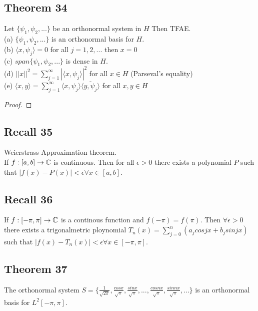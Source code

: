 \documentclass{article}
\begin{document}
\subsection * {Theorem 34}
Let $\{\psi_1, \psi_2,... \}$ be an orthonormal system in $H$ Then TFAE.\\
(a) $\{\psi_1, \psi_2,...\}$ is an orthonormal basis for $H$.\\
(b) $\langle x, \psi_j \rangle = 0 $ for all $j=1,2,...$ then $x=0$\\
(c) $span\{ \psi_1, \psi_2,...\} $ is dense in $H$.\\
(d) $||x||^2 = \sum_{j=1}^{\infty} |\langle x, \psi_j\rangle |^2 $ for all $x\in H$ (Parseval's equality)\\
(e) $\langle x,y \rangle = \sum_{j=1}^{\infty}\langle x, \psi_j \rangle \overline{\langle y, \psi_j \rangle}$ for all $ x,y \in H$\\

\begin{proof}
\end{proof}

\subsection*{Recall 35}
Weierstrass Approximation theorem.\\
If $f:[a,b]\rightarrow \Bbb{C}$ is continuous. Then for all $\epsilon >0$ there exists a polynomial $P$ such that $|f(x)-P(x)|<\epsilon \forall x\in [a,b]$.

\subsection*{Recall 36}
If $f:[-\pi, \pi ]\rightarrow \Bbb{C} $ is a continous function and $f(-\pi)=f(\pi)$. Then $\forall \epsilon >0$ there exists a trigonalmetric ploynomial $T_n(x)=\sum_{j=0}^{n}(a_j cos jx+b_jsin jx)$ such that $|f(x) -T_n(x)|<\epsilon \forall x\in [-\pi,\pi]$.

\subsection*{Theorem 37}
The orthonormal system $S=\{\frac{1}{\sqrt{2\pi}},\frac{cos x}{\sqrt{\pi}},\frac{sin x}{\sqrt{\pi}},...,\frac{cos nx}{\sqrt{\pi}},\frac{sin nx}{\sqrt{\pi}},...\}$ is an orthonormal basis for $L^2[-\pi,\pi]$.
\end{document}
